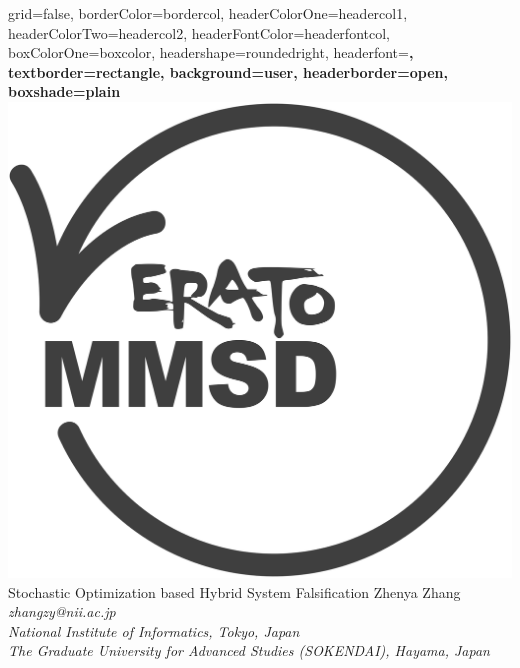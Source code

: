 \documentclass[a0paper,portrait]{baposter}
\begin{document}
\begin{poster}{
grid=false,
borderColor=bordercol, %
headerColorOne=headercol1, %
headerColorTwo=headercol2, %
headerFontColor=headerfontcol, %
boxColorOne=boxcolor, %
headershape=roundedright, %
headerfont=\Large\sf\bf, %
textborder=rectangle,
background=user,
headerborder=open, %
boxshade=plain
}
{\includegraphics[scale=0.2]{erato.png}}
%
%
{\huge    {Stochastic Optimization based Hybrid System Falsification} } %
{\vspace{0.3em} \smaller Zhenya Zhang  \\  %
   \smaller \it{zhangzy@nii.ac.jp} \\
\smaller \it {National Institute of Informatics, Tokyo, Japan}\\ \it{The Graduate University for Advanced Studies (SOKENDAI), Hayama, Japan} } %


\end{poster}
\end{document}
